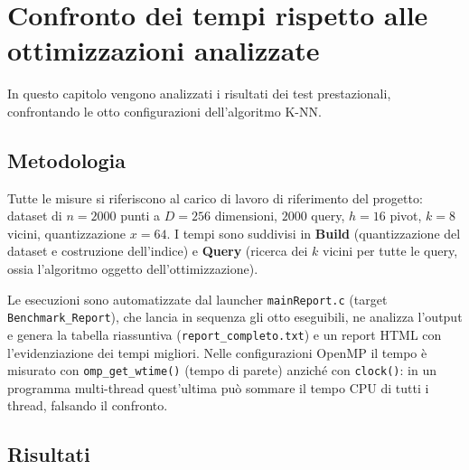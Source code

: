 \maketitle
\chapter{Confronto dei tempi rispetto alle ottimizzazioni analizzate}

In questo capitolo vengono analizzati i risultati dei test prestazionali, confrontando le otto configurazioni dell'algoritmo K-NN.

\section{Metodologia}
Tutte le misure si riferiscono al carico di lavoro di riferimento del progetto: dataset di $n=2000$ punti a $D=256$ dimensioni, $2000$ query, $h=16$ pivot, $k=8$ vicini, quantizzazione $x=64$. I tempi sono suddivisi in \textbf{Build} (quantizzazione del dataset e costruzione dell'indice) e \textbf{Query} (ricerca dei $k$ vicini per tutte le query, ossia l'algoritmo oggetto dell'ottimizzazione).

Le esecuzioni sono automatizzate dal launcher \texttt{mainReport.c} (target \texttt{Benchmark\_Report}), che lancia in sequenza gli otto eseguibili, ne analizza l'output e genera la tabella riassuntiva (\texttt{report\_completo.txt}) e un report HTML con l'evidenziazione dei tempi migliori. Nelle configurazioni OpenMP il tempo è misurato con \texttt{omp\_get\_wtime()} (tempo di parete) anziché con \texttt{clock()}: in un programma multi-thread quest'ultima può sommare il tempo CPU di tutti i thread, falsando il confronto.

\section{Risultati}

